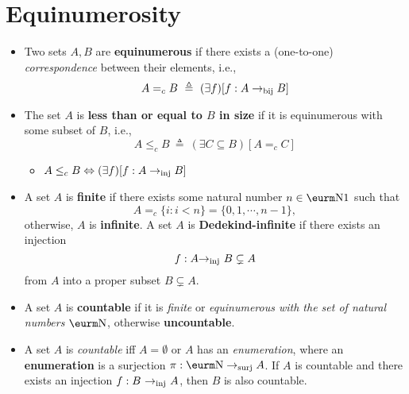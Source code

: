\documentclass{myproc}
\begin{document}
\section{Equinumerosity}
\begin{itemize}
\item Two sets $A, B$ are {\bf{}equinumerous} if there exists a
	(one-to-one) 
	{\em{}correspondence} between their elements, i.e.,
	\[ A =_c B 
		\ \triangleq\ 
		(\exists{f})[f: A \rightarrow_{\mbox{\scriptsize{}bij}} B] \]
\item The set $A$ is {\bf{}less than or equal to $B$ in size} if
	it is equinumerous with some subset of $B$, i.e.,
	\[ A \le_c B 
		\ \triangleq\ 
		(\exists{C \subseteq B})[A =_c C] \]
		\begin{itemize}
		\item $A \le_c B \Leftrightarrow (\exists{f})[f: A 
			\rightarrow_{\mbox{\scriptsize{}inj}} B]$
		\end{itemize}
\item A set $A$ is {\bf{}finite} if there exists some natural number 
	$n \in \N1$
	such that
		\[ A =_c \{i : i < n\} = \{0, 1, \cdots, n-1\}, \]
	otherwise, $A$ is {\bf{}infinite}.
	\bit
	\w A set $A$ is {\bf{}Dedekind-infinite} if there exists an injection
		\[ f: A \mbox{$\rightarrow$}_{\mbox{\scriptsize{}inj}}\ B \subsetneq A \]
		from $A$ into a proper subset $B \subsetneq A$. 
		
	\eit
\item A set $A$ is {\bf{}countable} if it is {\em{}finite\/} or 
	{\em{}equinumerous with the set of natural numbers $\N$},
	otherwise {\bf{}uncountable}.
	\bit
	\item A set $A$ is {\em{}countable\/} iff $A = \emptyset$ or
		$A$ has an {\em{}enumeration\/}, where
		an {\bf{}enumeration} is a surjection $\pi: {\N} 
		\rightarrow_{\mbox{\scriptsize{}surj}} A$.
	\w If $A$ is countable and there exists an injection
		$f: B\ \mbox{$\rightarrow$}_{\mbox{\scriptsize{}inj}}\ A$, then $B$ is also countable.
	\end{itemize}
\end{document}
